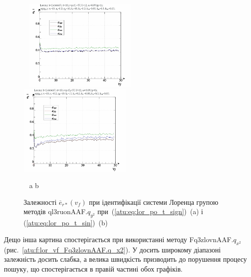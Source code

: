 \begin{figure}[ht!]
  \begin{center}
    ~ \hfill
    \includegraphics[width=0.49\textwidth]{p/cha/lor/ql3ruonAAF/lor_ql3ruonAAF_qy2-p_v_f_e_sign.png}
    \hfill
    \includegraphics[width=0.49\textwidth]{p/cha/lor/ql3ruonAAF/lor_ql3ruonAAF_qy2-p_v_f_e_sin.png}
    \hfill ~
  \end{center}
  \vspace{-1.0ex}
  \begin{center}
    ~ \hfill a \hfill\hfill b \hfill ~
  \end{center}
  \vspace{-1.5ex}
  \caption{Залежності $ \overline{e}_{r *} (v_f) $ при ідентифікації системи Лоренца групою методів ql3ruonAAF.$q_{y^2} $ при~(\ref{atu:eq:lor_po_t_sign})~(a) і (\ref{atu:eq:lor_po_t_sin})~(b)}
\label{atu:f:lor_vf_ql3ruonAAF.q_y2}
\end{figure}

Дещо інша картина спостерігається при використанні методу
Fq3zlovnAAF.$q_{x^2}$
(рис.~\ref{atu:f:lor_vf_Fq3zlovnAAF.q_x2}).
У досить широкому діапазоні залежність досить слабка, а
велика швидкість призводить до порушення процесу пошуку, що
спостерігається в правій частині обох графіків.

